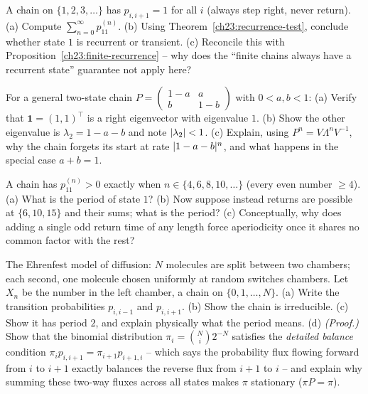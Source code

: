 \begin{exercise}
\label{ch23:ex-recurrence-sum}
A chain on $\{1, 2, 3, \dots\}$ has $p_{i,i+1} = 1$ for all $i$ (always step right, never
return). (a) Compute $\sum_{n=0}^\infty p_{11}^{(n)}$. (b) Using
Theorem~\ref{ch23:recurrence-test}, conclude whether state $1$ is recurrent or transient.
(c) Reconcile this with Proposition~\ref{ch23:finite-recurrence} -- why does the ``finite
chains always have a recurrent state'' guarantee not apply here?
\end{exercise}

\begin{exercise}
\label{ch23:ex-eigen}
For a general two-state chain $P = \left(\begin{smallmatrix} 1-a & a \\ b & 1-b
\end{smallmatrix}\right)$ with $0 < a, b < 1$: (a) Verify that $\mathbf{1} = (1,1)^\top$ is a
right eigenvector with eigenvalue $1$. (b) Show the other eigenvalue is $\lambda_2 = 1 - a -
b$ and note $\lvert\lambda_2\rvert < 1$. (c) Explain, using
$P^n = V \Lambda^n V^{-1}$, why the chain forgets its start at rate $\lvert1-a-b\rvert^n$, and what
happens in the special case $a + b = 1$.
\end{exercise}

\begin{exercise}
\label{ch23:ex-period-gcd}
A chain has $p_{11}^{(n)} > 0$ exactly when $n \in \{4, 6, 8, 10, \dots\}$ (every even number
$\ge 4$). (a) What is the period of state $1$? (b) Now suppose instead returns are possible at
$\{6, 10, 15\}$ and their sums; what is the period? (c) Conceptually, why does adding a single
odd return time of any length force aperiodicity once it shares no common factor with the
rest?
\end{exercise}

\begin{exercise}
\label{ch23:ex-build}
The Ehrenfest model of diffusion: $N$ molecules are split between two chambers; each second,
one molecule chosen uniformly at random switches chambers. Let $X_n$ be the number in the
left chamber, a chain on $\{0, 1, \dots, N\}$. (a) Write the transition probabilities
$p_{i,i-1}$ and $p_{i,i+1}$. (b) Show the chain is irreducible. (c) Show it has period $2$, and
explain physically what the period means. (d) \emph{(Proof.)} Show that the binomial
distribution $\pi_i = \binom{N}{i} 2^{-N}$ satisfies the \emph{detailed balance} condition
$\pi_i p_{i,i+1} = \pi_{i+1} p_{i+1,i}$ -- which says the probability flux flowing forward
from $i$ to $i+1$ exactly balances the reverse flux from $i+1$ to $i$ -- and explain why summing
these two-way fluxes across all states makes $\pi$ stationary ($\pi P = \pi$).
\end{exercise}
